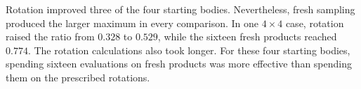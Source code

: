 \documentclass[11pt,a4paper]{article}
\begin{document}
Rotation improved three of the four starting bodies. Nevertheless, fresh
sampling produced the larger maximum in every comparison. In one $4\times4$
case, rotation raised the ratio from $0.328$ to $0.529$, while the sixteen fresh
products reached $0.774$. The rotation calculations also took longer. For these four starting bodies, spending sixteen evaluations on fresh products
was more effective than spending them on the prescribed rotations.
\end{document}
